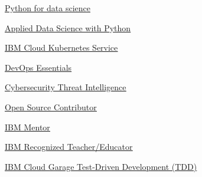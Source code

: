 \begin{coursework}


        {\href{https://courses.edx.org/certificates/0626a02340944e6b9b1854be5e171da0}
        {\underline{Python for data science}}}






        {\href{https://www.youracclaim.com/badges/6f524dff-5ffb-42bd-8e32-f4f3ea50e26c/public_url}
        {\underline{Applied Data Science with Python}}}

        {\href{https://www.youracclaim.com/badges/70a31b3d-c964-4a2d-8f31-ed58a0b00ea7}
        {\underline{IBM Cloud Kubernetes Service}}}

        {\href{https://www.youracclaim.com/badges/b2d8b99b-d28c-4e36-9969-926df409912d}
        {\underline{DevOps Essentials}}}

        {\href{https://www.credly.com/badges/0c479de3-7e7e-4cf5-a912-b44de983b144}
        {\underline{Cybersecurity Threat Intelligence}}}

        {\href{https://www.credly.com/badges/bbdcc62b-203f-4e3d-b395-b04c92a26e68}
        {\underline{Open Source Contributor}}}

        {\href{https://www.credly.com/badges/abf05612-bcbe-4746-a697-78417d0cabdb}
        {\underline{IBM Mentor}}}

        {\href{https://www.credly.com/badges/d59b27fb-f4e9-4271-ab4a-172e0b88c091}
        {\underline{IBM Recognized Teacher/Educator}}}

        {\href{https://www.credly.com/badges/9a2fbd8d-8140-430e-b2a6-2befbc0ff81e}
        {\underline{IBM Cloud Garage Test-Driven Development (TDD)}}}

\end{coursework}